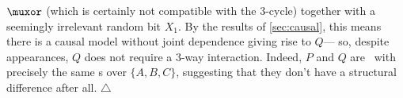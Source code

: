     $\muxor$
    (which is certainly not compatible with the 3-cycle)
together with a seemingly irrelevant random bit $X_1$.
By the results of \cref{sec:causal},
this means there is a causal model without joint dependence giving rise to $Q$---%
    so,
    despite appearances,
    $Q$ does not 
    require a 3-way interaction.
    Indeed, $P$ and $Q$ are \scible\ with precisely the same \hgraph s over $\{A,B,C\}$, 
    suggesting that they don't have a structural difference after all. 
\hfill$\triangle$

